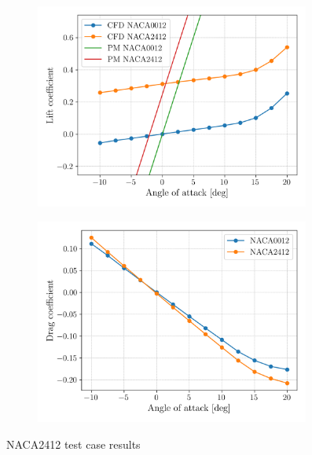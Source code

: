 \documentclass{article}
\begin{document}
\begin{figure}[H]
    \centering
    \begin{subfigure}{0.49\textwidth}
        \centering
        \includegraphics[width=0.99\textwidth]{figures/cl_alpha.png}
        \caption{}
        \label{fig:cl_alpha}
    \end{subfigure}
    \begin{subfigure}{0.49\textwidth}
        \centering
        \includegraphics[width=0.99\textwidth]{figures/cd_alpha.png}
        \caption{}
        \label{fig:cd_alpha}
    \end{subfigure}
    \caption{NACA2412 test case results}
\end{figure}
\end{document}
